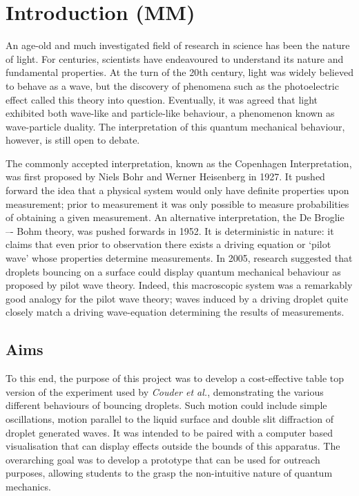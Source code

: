 \section{Introduction (MM)}
An age-old and much investigated field of research in science has been the nature of light. For centuries, scientists have endeavoured to understand its nature and fundamental properties. At the turn of the 20th century, light was widely believed to behave as a wave, but the discovery of phenomena such as the photoelectric effect called this theory into question. Eventually, it was agreed that light exhibited both wave-like and particle-like behaviour, a phenomenon known as wave-particle duality. The interpretation of this quantum mechanical behaviour, however, is still open to debate.

The commonly accepted interpretation, known as the Copenhagen Interpretation, was first proposed by Niels Bohr and Werner Heisenberg in 1927. It pushed forward the idea that a physical system would only have definite properties upon measurement; prior to measurement it was only possible to measure probabilities of obtaining a given measurement. An alternative interpretation, the De Broglie –- Bohm theory, was pushed forwards in 1952. It is deterministic in nature: it claims that even prior to observation there exists a driving equation or `pilot wave' whose properties determine measurements. In 2005, research suggested \cite{couder} that droplets bouncing on a surface could display quantum mechanical behaviour as proposed by pilot wave theory. Indeed, this macroscopic system was a remarkably good analogy for the pilot wave theory; waves induced by a driving droplet quite closely match a driving wave-equation determining the results of measurements. 
\subsection{Aims}
To this end, the purpose of this project was to develop a cost-effective table top version of the experiment used by \textit{Couder et al.}, demonstrating the various different behaviours of bouncing droplets. Such motion could include simple oscillations, motion parallel to the liquid surface and double slit diffraction of droplet generated waves. It was intended to be paired with a computer based visualisation that can display effects outside the bounds of this apparatus. The overarching goal was to develop a prototype that can be used for outreach purposes, allowing  students to the grasp the non-intuitive nature of quantum mechanics. 

